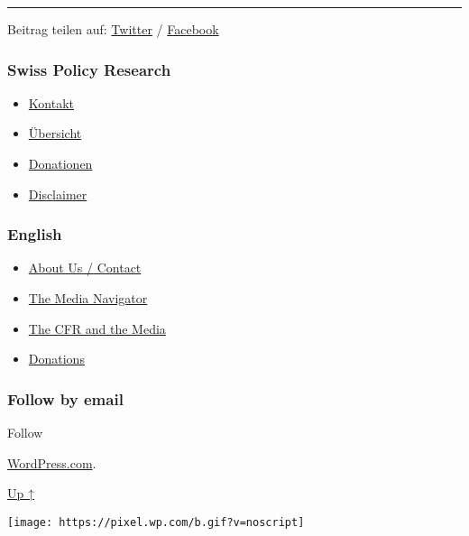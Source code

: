 \begin{center}\rule{0.5\linewidth}{\linethickness}\end{center}

Beitrag teilen auf:
\href{https://twitter.com/intent/tweet?url=https://swprs.org/der-wikipedia-prozess/}{Twitter}
/
\href{https://www.facebook.com/share.php?u=https://swprs.org/der-wikipedia-prozess/}{Facebook}

\hypertarget{swiss-policy-research}{%
\subsubsection{Swiss Policy Research}\label{swiss-policy-research}}

\begin{itemize}
\tightlist
\item
  \href{https://swprs.org/kontakt/}{Kontakt}
\item
  \href{https://swprs.org/uebersicht/}{Übersicht}
\item
  \href{https://swprs.org/donationen/}{Donationen}
\item
  \href{https://swprs.org/disclaimer/}{Disclaimer}
\end{itemize}

\hypertarget{english}{%
\subsubsection{English}\label{english}}

\begin{itemize}
\tightlist
\item
  \href{https://swprs.org/contact/}{About Us / Contact}
\item
  \href{https://swprs.org/media-navigator/}{The Media Navigator}
\item
  \href{https://swprs.org/the-american-empire-and-its-media/}{The CFR
  and the Media}
\item
  \href{https://swprs.org/donations/}{Donations}
\end{itemize}

\hypertarget{follow-by-email}{%
\subsubsection{Follow by email}\label{follow-by-email}}

Follow

\href{https://wordpress.com/?ref=footer_custom_com}{WordPress.com}.

\protect\hyperlink{}{Up ↑}

\texttt{[image: https://pixel.wp.com/b.gif?v=noscript]}
